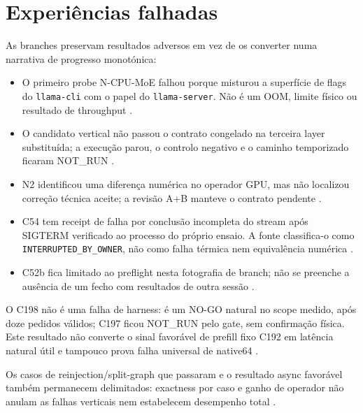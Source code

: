 \section{Experiências falhadas}
As branches preservam resultados adversos em vez de os converter numa narrativa de progresso monotónica:

\begin{itemize}
\item O primeiro probe N-CPU-MoE falhou porque misturou a superfície de flags do \texttt{llama-cli} com o papel do \texttt{llama-server}. Não é um OOM, limite físico ou resultado de throughput .
\item O candidato vertical não passou o contrato congelado na terceira layer substituída; a execução parou, o controlo negativo e o caminho temporizado ficaram NOT\_RUN .
\item N2 identificou uma diferença numérica no operador GPU, mas não localizou correção técnica aceite; a revisão A+B manteve o contrato pendente  .
\item C54 tem receipt de falha por conclusão incompleta do stream após SIGTERM verificado ao processo do próprio ensaio. A fonte classifica-o como \texttt{INTERRUPTED\_BY\_OWNER}, não como falha térmica nem equivalência numérica .
\item C52b fica limitado ao preflight nesta fotografia de branch; não se preenche a ausência de um fecho com resultados de outra sessão .
\end{itemize}

O C198 não é uma falha de harness: é um NO-GO natural no scope medido, após doze pedidos válidos; C197 ficou NOT\_RUN pelo gate, sem confirmação física. Este resultado não converte o sinal favorável de prefill fixo C192 em latência natural útil e tampouco prova falha universal de native64 .

Os casos de reinjection/split-graph que passaram e o resultado async favorável também permanecem delimitados: exactness por caso e ganho de operador não anulam as falhas verticais nem estabelecem desempenho total   .
